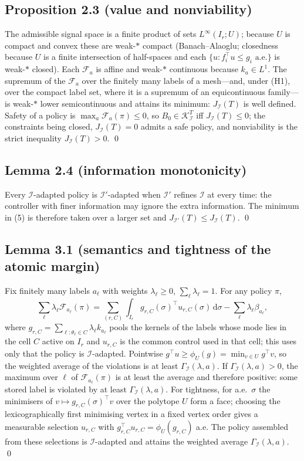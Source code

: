 \documentclass[11pt,a4paper]{article}
\theoremstyle{plain}
\theoremstyle{definition}
\theoremstyle{remark}
\newcommand{\calI}{\mathcal{I}}
\newcommand{\calK}{\mathcal{K}}
\newcommand{\calF}{\mathcal{F}}
\newcommand{\J}{J_{\calI}(T)}
\newcommand{\Gam}{\Gamma_{\calI}}
\newcommand{\dd}{\,\mathrm{d}}
\begin{document}
\subsection{Proposition 2.3 (value and nonviability)}
The admissible signal space is a finite product of sets $L^\infty(I_r;U)$; because $U$ is compact and convex these are weak-$\ast$ compact (Banach--Alaoglu; closedness because $U$ is a finite intersection of half-spaces and each $\{u:f_i^\top u\le g_i\text{ a.e.}\}$ is weak-$\ast$ closed). Each $\calF_a$ is affine and weak-$\ast$ continuous because $k_a\in L^1$. The supremum of the $\calF_a$ over the finitely many labels of a mesh---and, under (H1), over the compact label set, where it is a supremum of an equicontinuous family---is weak-$\ast$ lower semicontinuous and attains its minimum: $\J$ is well defined. Safety of a policy is $\max_a\calF_a(\pi)\le0$, so $B_0\in\calK^T_\calI$ iff $\J\le0$; the constraints being closed, $\J=0$ admits a safe policy, and nonviability is the strict inequality $\J>0$. \qed

\subsection{Lemma 2.4 (information monotonicity)}
Every $\calI$-adapted policy is $\calI'$-adapted when $\calI'$ refines $\calI$ at every time: the controller with finer information may ignore the extra information. The minimum in (5) is therefore taken over a larger set and $J_{\calI'}(T)\le\J$. \qed

\subsection{Lemma 3.1 (semantics and tightness of the atomic margin)}
Fix finitely many labels $a_\ell$ with weights $\lambda_\ell\ge0$, $\sum_\ell\lambda_\ell=1$. For any policy $\pi$,
\[
\sum_\ell\lambda_\ell\calF_{a_\ell}(\pi)=\sum_{(r,C)}\int_{I_r}g_{r,C}(\sigma)^\top u_{r,C}(\sigma)\dd\sigma-\sum_\ell\lambda_\ell\beta_{a_\ell},
\]
where $g_{r,C}=\sum_{\ell:\theta_\ell\in C}\lambda_\ell k_{a_\ell}$ pools the kernels of the labels whose mode lies in the cell $C$ active on $I_r$ and $u_{r,C}$ is the common control used in that cell; this uses only that the policy is $\calI$-adapted. Pointwise $g^\top u\ge\phi_U(g)=\min_{v\in U}g^\top v$, so the weighted average of the violations is at least $\Gam(\lambda,a)$. If $\Gam(\lambda,a)>0$, the maximum over $\ell$ of $\calF_{a_\ell}(\pi)$ is at least the average and therefore positive: some stored label is violated by at least $\Gam(\lambda,a)$. For tightness, for a.e.\ $\sigma$ the minimisers of $v\mapsto g_{r,C}(\sigma)^\top v$ over the polytope $U$ form a face; choosing the lexicographically first minimising vertex in a fixed vertex order gives a measurable selection $u_{r,C}$ with $g_{r,C}^\top u_{r,C}=\phi_U(g_{r,C})$ a.e. The policy assembled from these selections is $\calI$-adapted and attains the weighted average $\Gam(\lambda,a)$. \qed
\end{document}
